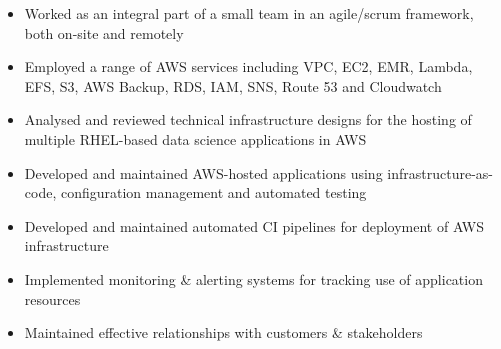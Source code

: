 \documentclass[6pt,a4paper,ragged2e,withhyper]{altacv}
\begin{document}


  \makecvheader


  \begin{paracol}{2}



    \begin{itemize}
      \item Worked as an integral part of a small team in an agile/scrum framework, both on-site and remotely
      \item Employed a range of AWS services including VPC, EC2, EMR, Lambda, EFS, S3, AWS Backup, RDS, IAM, SNS, Route 53 and Cloudwatch
      \item Analysed and reviewed technical infrastructure designs for the hosting of multiple RHEL-based data science applications in AWS
      \item Developed and maintained AWS-hosted applications using infrastructure-as-code, configuration management and automated testing
      \item Developed and maintained automated CI pipelines for deployment of AWS infrastructure
      \item Implemented monitoring \& alerting systems for tracking use of application resources
      \item Maintained effective relationships with customers \& stakeholders
    \end{itemize}

    \vspace{-0.3cm}\divider


    \vspace{-0.3cm}\divider


    \vspace{-0.3cm}\divider


\end{paracol}
\end{document}
